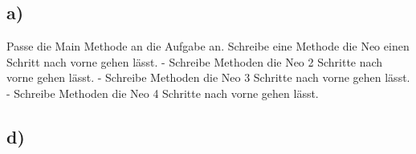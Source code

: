 \subsection*{a)}
	Passe die Main Methode an die Aufgabe an.
	Schreibe eine Methode die Neo einen Schritt nach vorne gehen lässt.
	- Schreibe Methoden die Neo 2 Schritte nach vorne gehen lässt.
	- Schreibe Methoden die Neo 3 Schritte nach vorne gehen lässt.
	- Schreibe Methoden die Neo 4 Schritte nach vorne gehen lässt.
\subsection*{d)}